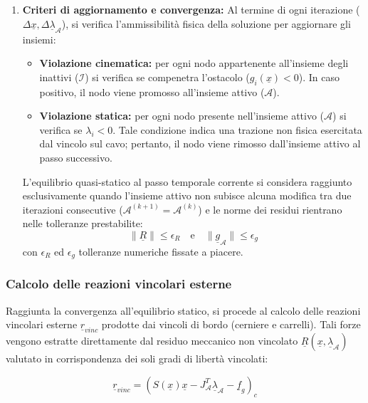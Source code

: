 \begin{enumerate}
  \item \textbf{Criteri di aggiornamento e convergenza:}
  Al termine di ogni iterazione ($\Delta \underline{x}, \Delta \underline{\lambda}_{\mathcal{A}}$), si verifica l'ammissibilità fisica della soluzione per aggiornare gli insiemi:
  \begin{itemize}
    \item \textbf{Violazione cinematica:} per ogni nodo appartenente all'insieme degli inattivi ($\mathcal{I}$) si verifica se compenetra l'ostacolo ($g_i(\underline{x}) < 0$). In caso positivo, il nodo viene promosso all'insieme attivo ($\mathcal{A}$).
    \item \textbf{Violazione statica:} per ogni nodo presente nell'insieme attivo ($\mathcal{A}$) si verifica se $\lambda_i < 0$. Tale condizione indica una trazione non fisica esercitata dal vincolo sul cavo; pertanto, il nodo viene rimosso dall'insieme attivo al passo successivo.
  \end{itemize}
  L'equilibrio quasi-statico al passo temporale corrente si considera raggiunto esclusivamente quando l'insieme attivo non subisce alcuna modifica tra due iterazioni consecutive ($\mathcal{A}^{(k+1)} = \mathcal{A}^{(k)}$) e le norme dei residui rientrano nelle tolleranze prestabilite: 
  \begin{equation*}
  \|\underline{R}\| \le \epsilon_R \quad \text{e} \quad \|\underline{g}_{\mathcal{A}}\| \le \epsilon_g
  \end{equation*}
  con $\epsilon_R$ ed $\epsilon_g$ tolleranze numeriche fissate a piacere.
\end{enumerate}

\subsubsection{Calcolo delle reazioni vincolari esterne} 
Raggiunta la convergenza all'equilibrio statico, si procede al calcolo delle reazioni vincolari esterne $\underline{r}_{vinc}$ prodotte dai vincoli di bordo (cerniere e carrelli). Tali forze vengono estratte direttamente dal residuo meccanico non vincolato $\underline{R}(\underline{x}, \underline{\lambda}_{\mathcal{A}})$ valutato in corrispondenza dei soli gradi di libertà vincolati:

\begin{equation}
\underline{r}_{vinc} = \left( S(\underline{x})\underline{x} - J_{\mathcal{A}}^T \underline{\lambda}_{\mathcal{A}} - \underline{f}_{g} \right)_c
\label{eq:reazioni_vincolari}
\end{equation}

